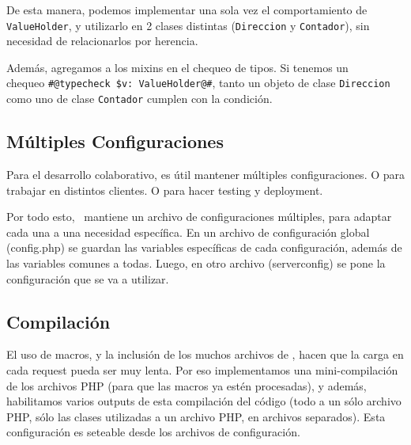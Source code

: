 De esta manera, podemos implementar una sola vez el comportamiento de \verb'ValueHolder', y utilizarlo en 2 clases distintas (\verb"Direccion" y \verb"Contador"), sin necesidad de relacionarlos por herencia.

Además, agregamos a los mixins en el chequeo de tipos. Si tenemos un \\ chequeo \verb"#@typecheck $v: ValueHolder@#", tanto un objeto de clase \verb"Direccion" como uno de clase \verb"Contador" cumplen con la condición.

\subsection{Múltiples Configuraciones}

Para el desarrollo colaborativo, es útil mantener múltiples configuraciones. O para trabajar en distintos clientes. O para hacer testing y deployment.

Por todo esto, \PWB \ mantiene un archivo de configuraciones múltiples, para adaptar cada una a una necesidad específica. En un archivo de configuración global (config.php) se guardan las variables específicas de cada configuración, además de las variables comunes a todas. Luego, en otro archivo (serverconfig) se pone la configuración que se va a utilizar.

\subsection{Compilación}

El uso de macros, y la inclusión de los muchos archivos de \PWB, hacen que la carga en cada request pueda ser muy lenta. Por eso implementamos una mini-compilación de los archivos PHP (para que las macros ya estén procesadas), y además, habilitamos varios outputs de esta compilación del código (todo a un sólo archivo PHP, sólo las clases utilizadas a un archivo PHP, en archivos separados). Esta configuración es seteable desde los archivos de configuración.
